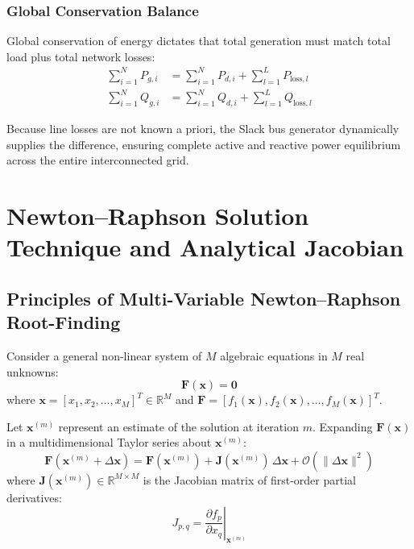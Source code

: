 \documentclass[12pt,a4paper,oneside]{report}
\begin{document}
\subsection{Global Conservation Balance}
Global conservation of energy dictates that total generation must match total load plus total network losses:
\begin{align}
\sum_{i=1}^N P_{g,i} &= \sum_{i=1}^N P_{d,i} + \sum_{l=1}^L P_{\text{loss},l} \\
\sum_{i=1}^N Q_{g,i} &= \sum_{i=1}^N Q_{d,i} + \sum_{l=1}^L Q_{\text{loss},l}
\end{align}

Because line losses are not known a priori, the Slack bus generator dynamically supplies the difference, ensuring complete active and reactive power equilibrium across the entire interconnected grid.

\chapter{Newton--Raphson Solution Technique and Analytical Jacobian}

\section{Principles of Multi-Variable Newton--Raphson Root-Finding}
Consider a general non-linear system of $M$ algebraic equations in $M$ real unknowns:
\begin{equation}
\mathbf{F}(\mathbf{x}) = \mathbf{0}
\end{equation}
where $\mathbf{x} = [x_1, x_2, \dots, x_M]^T \in \mathbb{R}^M$ and $\mathbf{F} = [f_1(\mathbf{x}), f_2(\mathbf{x}), \dots, f_M(\mathbf{x})]^T$.

Let $\mathbf{x}^{(m)}$ represent an estimate of the solution at iteration $m$. Expanding $\mathbf{F}(\mathbf{x})$ in a multidimensional Taylor series about $\mathbf{x}^{(m)}$:
\begin{equation}
\mathbf{F}(\mathbf{x}^{(m)} + \Delta \mathbf{x}) = \mathbf{F}(\mathbf{x}^{(m)}) + \mathbf{J}(\mathbf{x}^{(m)}) \, \Delta \mathbf{x} + \mathcal{O}(\|\Delta \mathbf{x}\|^2)
\end{equation}
where $\mathbf{J}(\mathbf{x}^{(m)}) \in \mathbb{R}^{M \times M}$ is the Jacobian matrix of first-order partial derivatives:
\begin{equation}
J_{p,q} = \left. \frac{\partial f_p}{\partial x_q} \right|_{\mathbf{x}^{(m)}}
\end{equation}
\end{document}
